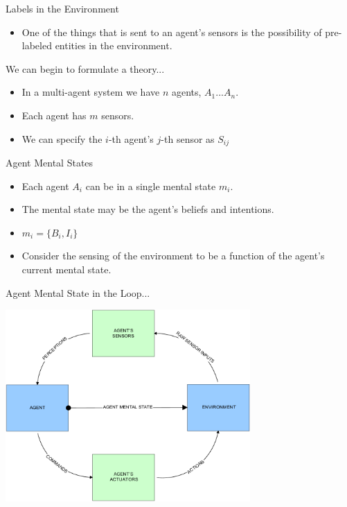 \documentclass[xcolor=dvipsnames,t]{beamer}
\begin{document}
\begin{frame}{Labels in the Environment}  
    \begin{itemize} 
        \item One of the things that is sent to an agent's sensors
              is the possibility of pre-labeled entities in the 
              environment. 
    \end{itemize} 
\end{frame} 

\begin{frame}{We can begin to formulate a theory...}
    \begin{itemize}
        \item In a multi-agent system we have $n$ agents, $A_1 ... A_n$. 
        \item Each agent has $m$ sensors.
        \item We can specify the $i$-th agent's $j$-th sensor as $S_{ij}$
    \end{itemize} 
\end{frame} 

\begin{frame}{Agent Mental States}
    \begin{itemize} 
        \item Each agent $A_i$ can be in a single mental state $m_i$. 
        \item The mental state may be the agent's beliefs and intentions.
        \item $m_i = \{B_i, I_i\}$
        \item Consider the sensing of the environment to be a function of the
              agent's current mental state. 
    \end{itemize} 
\end{frame} 

\begin{frame}{Agent Mental State in the Loop...}
    \begin{center} 
        \includegraphics[width=0.7\textwidth]{mentalstateinloop} 
    \end{center} 
\end{frame} 
\end{document}
